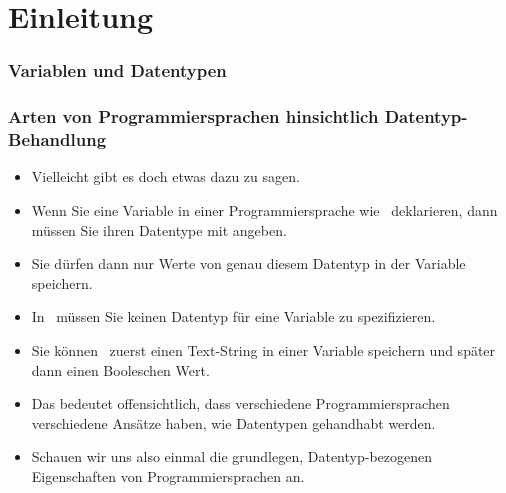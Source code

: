 \documentclass[aspectratio=169,mathserif,notheorems]{beamer}%
\subtitle{15.~Variablen:~Typen und Type Hints}%
\begin{document}
%
%
\startPresentation%
%
\section{Einleitung}%
\begin{frame}%
\frametitle{Variablen und Datentypen}%
%
%
%
%
%
%
\end{frame}%
%
\begin{frame}%
\frametitle{Arten von Programmiersprachen hinsichtlich Datentyp-Behandlung}%
\begin{itemize}%
\item Vielleicht gibt es doch etwas dazu zu sagen.%
\item<2-> Wenn Sie eine Variable in einer Programmiersprache wie~ deklarieren, dann müssen Sie ihren Datentype mit angeben.%
\item<3-> Sie dürfen dann nur Werte von genau diesem Datentyp in der Variable speichern.%
\item<4-> In \python\ müssen Sie keinen Datentyp für eine Variable zu spezifizieren.%
\item<5-> Sie können \DEzB\ zuerst einen Text-String in einer Variable speichern und später dann einen Booleschen Wert.%
\item<6-> Das bedeutet offensichtlich, dass verschiedene Programmiersprachen verschiedene Ansätze haben, wie Datentypen gehandhabt werden.%
\item<7-> Schauen wir uns also einmal die grundlegen, Datentyp-bezogenen Eigenschaften\cite{PSF:TPW:WIPADLAAASTL} von Programmiersprachen an.%
\end{itemize}%
\end{frame}%
\end{document}
